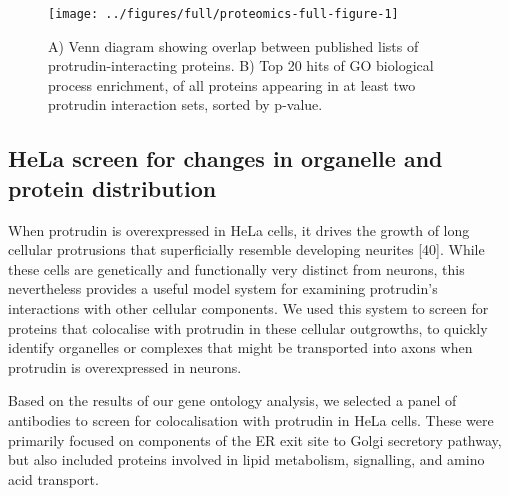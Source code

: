 \documentclass[
  12pt,
  a4paper,
]{book}
\begin{document}
\begin{figure}
\texttt{[image: ../figures/full/proteomics-full-figure-1]} \caption[Data set comparison and gene ontology of conserved protrudin-interacting proteins]{A) Venn diagram showing overlap between published lists of protrudin-interacting proteins. B) Top 20 hits of GO biological process enrichment, of all proteins appearing in at least two protrudin interaction sets, sorted by p-value.}\label{fig:proteomics-full-figure}
\end{figure}

\hypertarget{hela-screen-for-changes-in-organelle-and-protein-distribution}{%
\subsection{HeLa screen for changes in organelle and protein distribution}\label{hela-screen-for-changes-in-organelle-and-protein-distribution}}

When protrudin is overexpressed in HeLa cells, it drives the growth of long cellular protrusions that superficially resemble developing neurites {[}40{]}. While these cells are genetically and functionally very distinct from neurons, this nevertheless provides a useful model system for examining protrudin's interactions with other cellular components. We used this system to screen for proteins that colocalise with protrudin in these cellular outgrowths, to quickly identify organelles or complexes that might be transported into axons when protrudin is overexpressed in neurons.

Based on the results of our gene ontology analysis, we selected a panel of antibodies to screen for colocalisation with protrudin in HeLa cells. These were primarily focused on components of the ER exit site to Golgi secretory pathway, but also included proteins involved in lipid metabolism, signalling, and amino acid transport.
\end{document}
